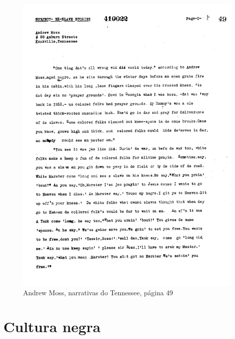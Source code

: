 \begin{absolutelynopagebreak}
\begin{vplace}
\begin{figure}[H]
\begin{adjustwidth}{-1.6cm}{}
  \vspace*{-2cm}
  \includegraphics[width=130mm]{./imgs/Cap6.jpg}  
\end{adjustwidth}
  \caption{Andrew Moss, narrativas do Tennessee, página 49}
\end{figure}
\end{vplace}

\end{absolutelynopagebreak}

\chapter{Cultura negra}

